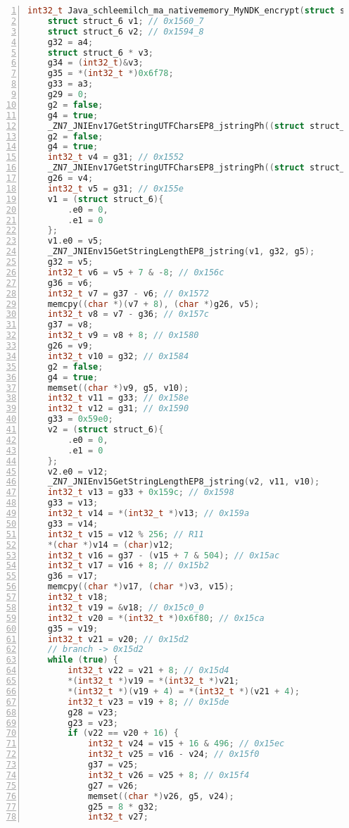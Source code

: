 \begin{appendices}
\begin{lstlisting}[language=C++, caption=Decompiled AES Encrypt(), label=dec_aes_encrypt, numbers=left]
int32_t Java_schleemilch_ma_nativememory_MyNDK_encrypt(struct struct_6 a1, int32_t a2, int32_t a3, int32_t a4, int32_t a5, int32_t a6, int32_t a7, int32_t a8, int32_t a9, int32_t a10, int32_t a11) {
    struct struct_6 v1; // 0x1560_7
    struct struct_6 v2; // 0x1594_8
    g32 = a4;
    struct struct_6 * v3;
    g34 = (int32_t)&v3;
    g35 = *(int32_t *)0x6f78;
    g33 = a3;
    g29 = 0;
    g2 = false;
    g4 = true;
    _ZN7_JNIEnv17GetStringUTFCharsEP8_jstringPh((struct struct_6 *)a1.e0, (char *)a3);
    g2 = false;
    g4 = true;
    int32_t v4 = g31; // 0x1552
    _ZN7_JNIEnv17GetStringUTFCharsEP8_jstringPh((struct struct_6 *)v4, (char *)g32);
    g26 = v4;
    int32_t v5 = g31; // 0x155e
    v1 = (struct struct_6){
        .e0 = 0,
        .e1 = 0
    };
    v1.e0 = v5;
    _ZN7_JNIEnv15GetStringLengthEP8_jstring(v1, g32, g5);
    g32 = v5;
    int32_t v6 = v5 + 7 & -8; // 0x156c
    g36 = v6;
    int32_t v7 = g37 - v6; // 0x1572
    memcpy((char *)(v7 + 8), (char *)g26, v5);
    int32_t v8 = v7 - g36; // 0x157c
    g37 = v8;
    int32_t v9 = v8 + 8; // 0x1580
    g26 = v9;
    int32_t v10 = g32; // 0x1584
    g2 = false;
    g4 = true;
    memset((char *)v9, g5, v10);
    int32_t v11 = g33; // 0x158e
    int32_t v12 = g31; // 0x1590
    g33 = 0x59e0;
    v2 = (struct struct_6){
        .e0 = 0,
        .e1 = 0
    };
    v2.e0 = v12;
    _ZN7_JNIEnv15GetStringLengthEP8_jstring(v2, v11, v10);
    int32_t v13 = g33 + 0x159c; // 0x1598
    g33 = v13;
    int32_t v14 = *(int32_t *)v13; // 0x159a
    g33 = v14;
    int32_t v15 = v12 % 256; // R11
    *(char *)v14 = (char)v12;
    int32_t v16 = g37 - (v15 + 7 & 504); // 0x15ac
    int32_t v17 = v16 + 8; // 0x15b2
    g36 = v17;
    memcpy((char *)v17, (char *)v3, v15);
    int32_t v18;
    int32_t v19 = &v18; // 0x15c0_0
    int32_t v20 = *(int32_t *)0x6f80; // 0x15ca
    g35 = v19;
    int32_t v21 = v20; // 0x15d2
    // branch -> 0x15d2
    while (true) {
        int32_t v22 = v21 + 8; // 0x15d4
        *(int32_t *)v19 = *(int32_t *)v21;
        *(int32_t *)(v19 + 4) = *(int32_t *)(v21 + 4);
        int32_t v23 = v19 + 8; // 0x15de
        g28 = v23;
        g23 = v23;
        if (v22 == v20 + 16) {
            int32_t v24 = v15 + 16 & 496; // 0x15ec
            int32_t v25 = v16 - v24; // 0x15f0
            g37 = v25;
            int32_t v26 = v25 + 8; // 0x15f4
            g27 = v26;
            memset((char *)v26, g5, v24);
            g25 = 8 * g32;
            int32_t v27;

\end{lstlisting}
\end{appendices}
